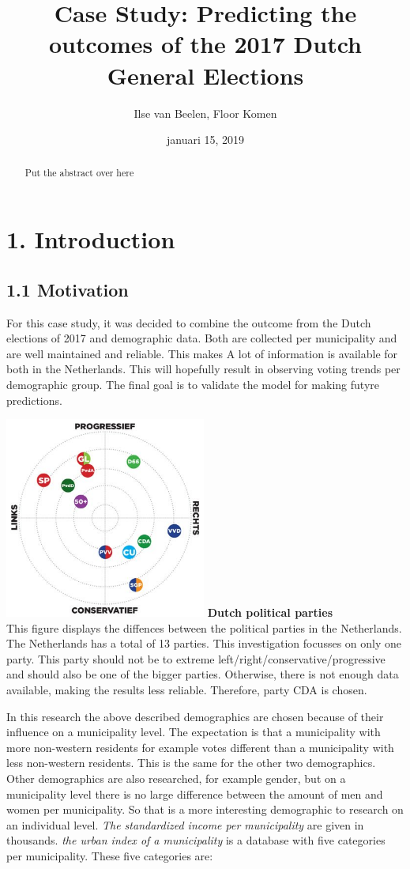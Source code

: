 \documentclass[11pt,]{article}
\title{Case Study: Predicting the outcomes of the 2017 Dutch General Elections}
\author{Ilse van Beelen, Floor Komen}
\date{januari 15, 2019}
\begin{document}
\maketitle
\begin{abstract}
Put the abstract over here
\end{abstract}

\section{1. Introduction}\label{introduction}

\subsection{1.1 Motivation}\label{motivation}

For this case study, it was decided to combine the outcome from the
Dutch elections of 2017 and demographic data. Both are collected per
municipality and are well maintained and reliable. This makes A lot of
information is available for both in the Netherlands. This will
hopefully result in observing voting trends per demographic group. The
final goal is to validate the model for making futyre predictions.

\includegraphics[width=2.60417in]{Partijlandschap.jpg} \textbf{Dutch
political parties}\\
This figure displays the diffences between the political parties in the
Netherlands. The Netherlands has a total of 13 parties. This
investigation focusses on only one party. This party should not be to
extreme left/right/conservative/progressive and should also be one of
the bigger parties. Otherwise, there is not enough data available,
making the results less reliable. Therefore, party CDA is chosen.

In this research the above described demographics are chosen because of
their influence on a municipality level. The expectation is that a
municipality with more non-western residents for example votes different
than a municipality with less non-western residents. This is the same
for the other two demographics. Other demographics are also researched,
for example gender, but on a municipality level there is no large
difference between the amount of men and women per municipality. So that
is a more interesting demographic to research on an individual level.
\emph{The standardized income per municipality} are given in thousands.
\emph{the urban index of a municipality} is a database with five
categories per municipality. These five categories are:
\end{document}
